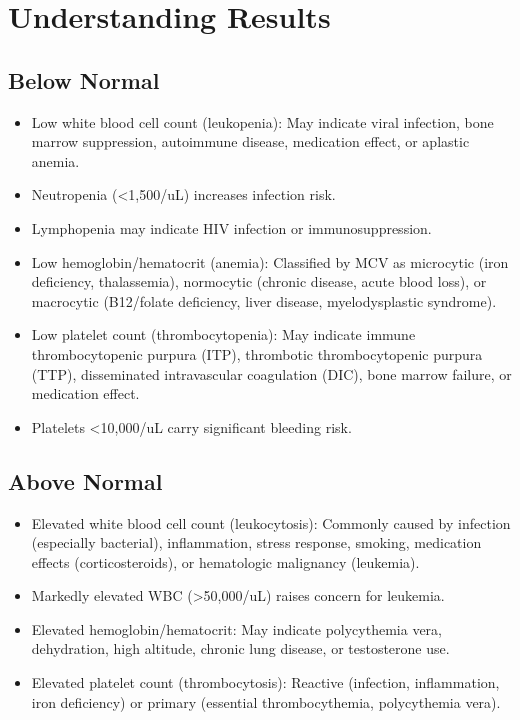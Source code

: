 \section*{Understanding Results}

\subsection*{Below Normal}
\begin{itemize}
  \item Low white blood cell count (leukopenia): May indicate viral infection, bone marrow suppression, autoimmune disease, medication effect, or aplastic anemia.
  \item Neutropenia (<1,500/uL) increases infection risk.
  \item Lymphopenia may indicate HIV infection or immunosuppression.
  \item Low hemoglobin/hematocrit (anemia): Classified by MCV as microcytic (iron deficiency, thalassemia), normocytic (chronic disease, acute blood loss), or macrocytic (B12/folate deficiency, liver disease, myelodysplastic syndrome).
  \item Low platelet count (thrombocytopenia): May indicate immune thrombocytopenic purpura (ITP), thrombotic thrombocytopenic purpura (TTP), disseminated intravascular coagulation (DIC), bone marrow failure, or medication effect.
  \item Platelets <10,000/uL carry significant bleeding risk.
\end{itemize}

\subsection*{Above Normal}
\begin{itemize}
  \item Elevated white blood cell count (leukocytosis): Commonly caused by infection (especially bacterial), inflammation, stress response, smoking, medication effects (corticosteroids), or hematologic malignancy (leukemia).
  \item Markedly elevated WBC (>50,000/uL) raises concern for leukemia.
  \item Elevated hemoglobin/hematocrit: May indicate polycythemia vera, dehydration, high altitude, chronic lung disease, or testosterone use.
  \item Elevated platelet count (thrombocytosis): Reactive (infection, inflammation, iron deficiency) or primary (essential thrombocythemia, polycythemia vera).
\end{itemize}


